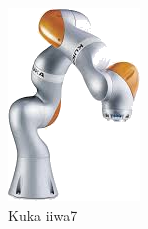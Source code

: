 \documentclass[]{article}
\begin{document}
\begin{figure}[hb!]
	\begin{subfigure}[b]{0.22\columnwidth}
		\includegraphics[width=\columnwidth]{iiwa}
		\caption{\footnotesize Kuka iiwa7}
		\label{fig:iiwa}
	\end{subfigure}
	\hfill
	\begin{subfigure}[b]{0.22\columnwidth}

\end{subfigure}
\end{figure}
\end{document}
